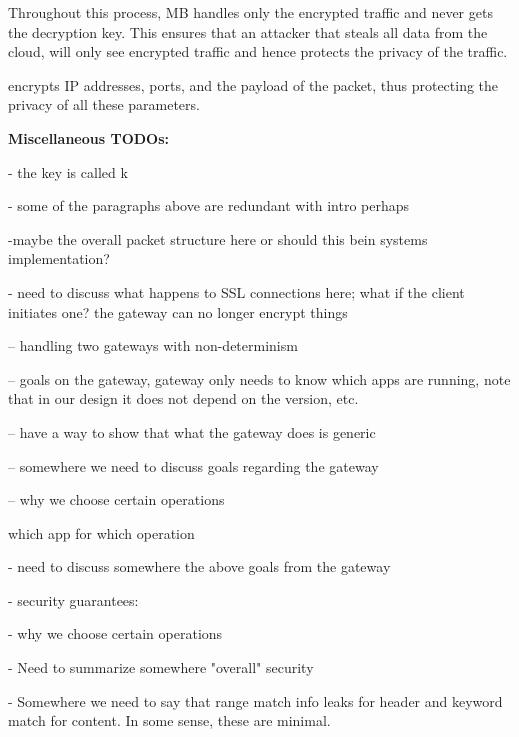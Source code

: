 Throughout this process, MB handles only the encrypted traffic and never gets the decryption key. This ensures
that an attacker that steals all data from the cloud, will only see encrypted traffic and hence protects the privacy of the 
traffic. 

\sys encrypts IP addresses, ports, and the payload of the packet, thus protecting the privacy of all these parameters. 


{\bf Miscellaneous TODOs:}

- the key is called k

- some of the paragraphs above are redundant with intro perhaps

-maybe the overall packet structure here or should this bein systems implementation? 

- need to discuss what happens to SSL connections here; what if the client initiates one? the gateway can no longer
encrypt things

-- handling two gateways with non-determinism

-- goals on the gateway, gateway only needs to know which apps are running, note that in our design
it does not depend on the version, etc. 

-- have a way to show that what the gateway does is generic 
   
-- somewhere we need to discuss goals regarding the gateway

-- why we choose certain operations

which app for which operation


- need to discuss somewhere the above goals from the gateway

- security guarantees:

- why we choose certain operations

- Need to summarize somewhere "overall" security

- Somewhere we need to say that range match info leaks for header and keyword match for content. In some sense, these are minimal. 

